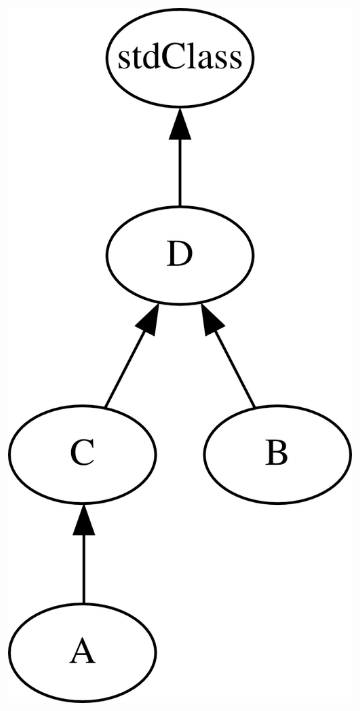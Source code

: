 \documentclass[../main.tex]{subfiles}
\begin{document}
    \begin{figure}
    \begin{subfigure}{.24\textwidth}
      \begin{center}
      \includegraphics[scale=0.7]{img/subtype-big.png}

\end{center}
\end{subfigure}
\end{figure}
\end{document}
